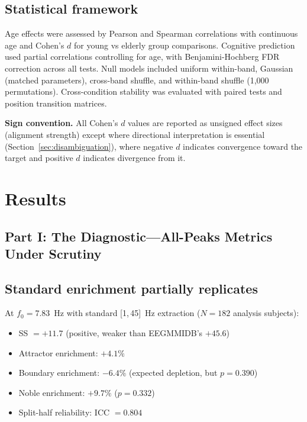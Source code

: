 \documentclass[11pt,a4paper]{article}
\newcommand{\fzero}{f_0}
\begin{document}
\subsection{Statistical framework}

Age effects were assessed by Pearson and Spearman correlations with continuous age and Cohen's $d$ for young vs elderly group comparisons. Cognitive prediction used partial correlations controlling for age, with Benjamini-Hochberg FDR correction \parencite{Benjamini1995} across all tests. Null models included uniform within-band, Gaussian (matched parameters), cross-band shuffle, and within-band shuffle (1{,}000 permutations). Cross-condition stability was evaluated with paired tests and position transition matrices.

\textbf{Sign convention.} All Cohen's $d$ values are reported as unsigned effect sizes (alignment strength) except where directional interpretation is essential (Section~\ref{sec:disambiguation}), where negative $d$ indicates convergence toward the target and positive $d$ indicates divergence from it.

\section{Results}

\subsection*{Part I: The Diagnostic---All-Peaks Metrics Under Scrutiny}

\subsection{Standard enrichment partially replicates}

At $\fzero = 7.83$~Hz with standard [1,\,45]~Hz extraction ($N = 182$ analysis subjects):
\begin{itemize}
    \item SS $= +11.7$ (positive, weaker than EEGMMIDB's $+45.6$)
    \item Attractor enrichment: $+4.1\%$
    \item Boundary enrichment: $-6.4\%$ (expected depletion, but $p = 0.390$)
    \item Noble enrichment: $+9.7\%$ ($p = 0.332$)
    \item Split-half reliability: ICC $= 0.804$
\end{itemize}
\end{document}
